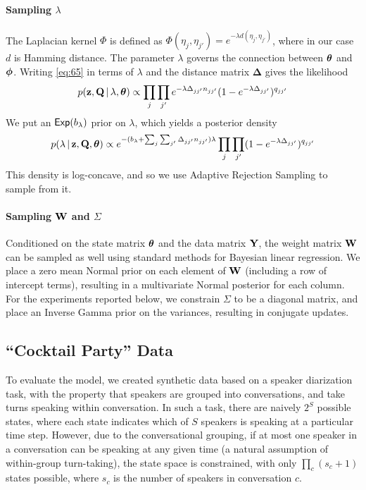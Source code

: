 \paragraph{Sampling \texorpdfstring{$\lambda$}{kernel decay rate}}
\label{sec:sampling-lambda}
The Laplacian kernel $\Phi$ is defined as $\Phi(\eta_j, \eta_{j'}) =
e^{-\lambda d(\eta_j,\eta_{j'})}$, where in our case $d$ is
  Hamming distance.  The parameter $\lambda$ governs the connection between $\boldsymbol{\theta}$ and
$\boldsymbol{\phi}$.  Writing \eqref{eq:65} in terms of $\lambda$ and the distance matrix
$\boldsymbol{\Delta}$ gives the likelihood
\begin{equation}
  \label{eq:88}
  p(\mathbf{z}, \mathbf{Q} \, \vert \, \lambda, \boldsymbol{\theta}) \propto \prod_{j}\prod_{j'}
  e^{-\lambda \Delta_{jj'} n_{jj'}}(1-e^{-\lambda\Delta_{jj'}})^{q_{jj'}} 
\end{equation}
We put an $\mathsf{Exp}(b_{\lambda})$ prior on $\lambda$, which yields a
posterior density
\begin{equation}
  \label{eq:88}
  p(\lambda \, \vert \, \mathbf{z}, \mathbf{Q}, \boldsymbol{\theta}) \propto
  e^{-(b_{\lambda} + \sum_{j}\sum_{j'} \Delta_{jj'} n_{jj'})\lambda} \prod_{j}\prod_{j'}
  (1-e^{-\lambda\Delta_{jj'}})^{q_{jj'}}
\end{equation}
This density is log-concave, and so we use Adaptive Rejection Sampling \cite{gilks1992adaptive}
to sample from it.

\paragraph{Sampling \texorpdfstring{$\mathbf{W}$}{weights} and
  \texorpdfstring{$\Sigma$}{emission covariance}}
Conditioned on the state matrix $\boldsymbol{\theta}$ and the data matrix $\mathbf{Y}$, 
the weight matrix $\mathbf{W}$ can be sampled as well using standard methods
for Bayesian linear regression.  We place a zero mean Normal prior on each
element of $\mathbf{W}$ (including a row of intercept terms), resulting in a
multivariate Normal posterior for each column.  For the experiments
reported below, we constrain $\Sigma$ to be a diagonal matrix, and
place an Inverse Gamma prior on the variances, resulting in conjugate updates.

\subsection{``Cocktail Party'' Data}

To evaluate the model, we created synthetic data based on a speaker 
diarization task, with the property that speakers are grouped into
conversations, and take turns speaking within conversation.   
In such a task, there are naively $2^S$ possible
states, where each state indicates which of $S$ speakers is speaking
at a particular time step.  However, due to the conversational grouping, if
at most one speaker in a conversation can be speaking at any given
time (a natural assumption of within-group turn-taking), 
the state space is constrained, with only $\prod_c (s_c + 1)$
states possible, where $s_c$ is the
number of speakers in conversation $c$.

